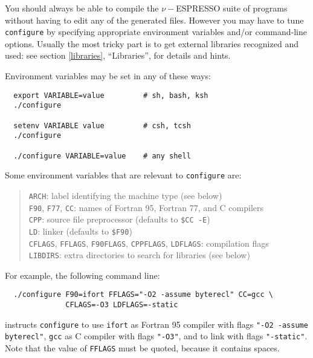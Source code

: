 \documentclass[12pt,a4paper]{article}
\begin{document}
You should always be able to compile the $\nu-$ESPRESSO suite of programs
without having to edit any of the generated files.  However you may
have to tune \texttt{configure} by specifying appropriate environment
variables and/or command-line options.
Usually the most tricky part is to get external libraries recognized
and used: see section \ref{libraries}, ``Libraries'', for details and
hints.

Environment variables may be set in any of these ways:
\begin{verbatim}
  export VARIABLE=value         # sh, bash, ksh
  ./configure

  setenv VARIABLE value         # csh, tcsh
  ./configure

  ./configure VARIABLE=value    # any shell
\end{verbatim}
Some environment variables that are relevant to \texttt{configure} are:
\begin{quote}
  \texttt{ARCH}:
    label identifying the machine type (see below)\\
  \texttt{F90}, \texttt{F77}, \texttt{CC}:
    names of Fortran 95, Fortran 77, and C compilers\\
  \texttt{CPP}:
    source file preprocessor (defaults to \texttt{\$CC -E})\\
  \texttt{LD}: linker (defaults to \texttt{\$F90})\\
  \texttt{CFLAGS}, \texttt{FFLAGS}, \texttt{F90FLAGS},
    \texttt{CPPFLAGS}, \texttt{LDFLAGS}:
    compilation flags\\
  \texttt{LIBDIRS}:
    extra directories to search for libraries (see below)
\end{quote}
For example, the following command line:
\begin{verbatim}
  ./configure F90=ifort FFLAGS="-O2 -assume byterecl" CC=gcc \
              CFLAGS=-O3 LDFLAGS=-static
\end{verbatim}
instructs \texttt{configure} to use \texttt{ifort} as Fortran 95
compiler with flags \texttt{"-O2 -assume byterecl"},
\texttt{gcc} as C compiler with flags \texttt{"-O3"}, and to link with
flags \texttt{"-static"}.  Note that the value of \texttt{FFLAGS} must
be quoted, because it contains spaces.
\end{document}
